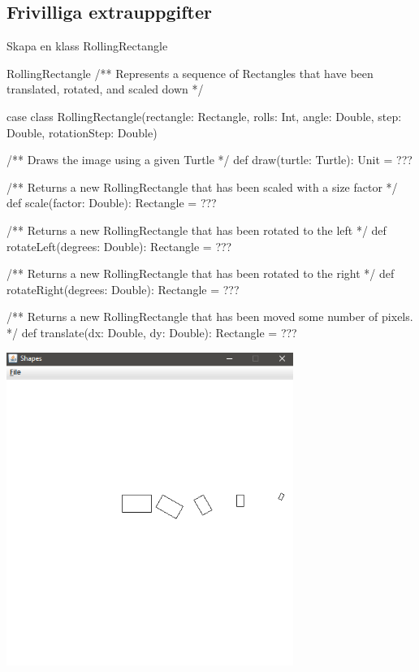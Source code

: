 \subsection{Frivilliga extrauppgifter}


\Task Skapa en klass RollingRectangle


\begin{ScalaSpec}{RollingRectangle}
/** Represents a sequence of Rectangles that have been translated,
       rotated, and scaled down */

case class RollingRectangle(rectangle: Rectangle,
                            rolls: Int,
                            angle: Double,
                            step: Double,
                            rotationStep: Double) {

  /** Draws the image using a given Turtle */
  def draw(turtle: Turtle): Unit = ???

  /** Returns a new RollingRectangle that has been scaled with a size factor */
  def scale(factor: Double): Rectangle = ???

  /** Returns a new RollingRectangle that has been rotated to the left */
  def rotateLeft(degrees: Double): Rectangle = ???

  /** Returns a new RollingRectangle that has been rotated to the right */
  def rotateRight(degrees: Double): Rectangle = ???

  /** Returns a new RollingRectangle that has been moved some number of pixels. */
  def translate(dx: Double, dy: Double): Rectangle = ???
}
\end{ScalaSpec}

\includegraphics[width=0.7\textwidth]{../img/w06-lab/RollingRectangle.png}


